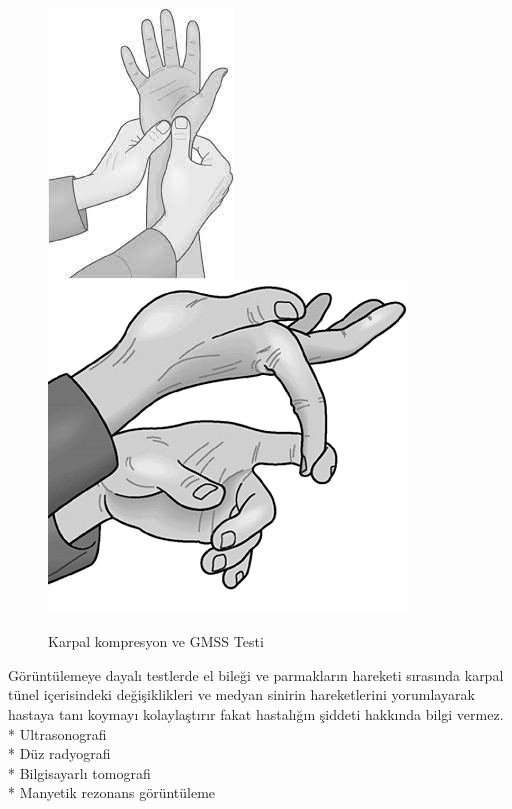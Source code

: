\documentclass[12pt,twoside]{deuthesis}
\begin{document}
\begin{figure}

{\centering \includegraphics[width=0.49\linewidth,height=0.22\textheight]{figure/karpal_komp} \includegraphics[width=0.49\linewidth,height=0.22\textheight]{figure/gerilmis} 

}

\caption{Karpal kompresyon ve GMSS Testi }\label{fig:unnamed-chunk-4}
\end{figure}
Görüntülemeye dayalı testlerde el bileği ve parmakların hareketi sırasında karpal tünel içerisindeki değişiklikleri ve medyan sinirin hareketlerini yorumlayarak hastaya tanı koymayı kolaylaştırır fakat hastalığın şiddeti hakkında bilgi vermez.
* Ultrasonografi\\
* Düz radyografi\\
* Bilgisayarlı tomografi\\
* Manyetik rezonans görüntüleme\\
\end{document}
